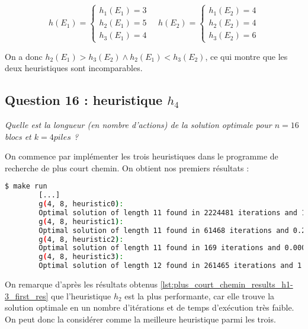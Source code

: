 \[
    h(E_1) = 
    \begin{cases} 
        h_1(E_1) = 3 \\
        h_2(E_1) = 5 \\
        h_3(E_1) = 4
    \end{cases}
    \quad
    h(E_2) =
    \begin{cases} 
        h_1(E_2) = 4 \\
        h_2(E_2) = 4 \\
        h_3(E_2) = 6
    \end{cases}
\]

On a donc $h_2(E_1) > h_3(E_2) \land h_2(E_1) < h_3(E_2)$, ce qui montre que les deux heuristiques sont incomparables.

\subsection{Question 16 : heuristique $h_4$}

\textit{Quelle est la longueur (en nombre d'actions) de la solution optimale pour $n = 16$ blocs et $k = 4 piles$ ?}

On commence par implémenter les trois heuristiques dans le programme de recherche de plus court chemin. On obtient nos premiers résultats :

\begin{minipage}{\dimexpr\linewidth-20pt}
    \begin{lstlisting}[language=bash, caption={Résultats de l'exécution du programme de recherche de plus court chemin avec 3 premières heuristiques pour $k = 4$ piles et $n = 8$ blocs.}, label={lst:plus_court_chemin_results_h1-3_first_res}]
        $ make run
        [...]
        g(4, 8, heuristic0): 
        Optimal solution of length 11 found in 2224481 iterations and 15.1703 seconds
        g(4, 8, heuristic1): 
        Optimal solution of length 11 found in 61468 iterations and 0.242329 seconds
        g(4, 8, heuristic2): 
        Optimal solution of length 11 found in 169 iterations and 0.000934 seconds
        g(4, 8, heuristic3): 
        Optimal solution of length 12 found in 261465 iterations and 1.12496 seconds
    \end{lstlisting}
\end{minipage}

On remarque d'après les résultats obtenus \ref{lst:plus_court_chemin_results_h1-3_first_res} que l'heuristique $h_2$ est la plus performante, car elle trouve la solution optimale en un nombre d'itérations et de temps d'exécution très faible. On peut donc la considérer comme la meilleure heuristique parmi les trois.

